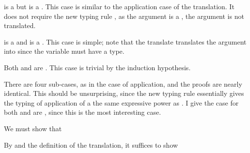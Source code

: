   \item[{\bfseries Sub-case:}] \im{\seone} is a  but \im{\setwo} is a  \im{\sApr}.
    This case is similar to the application case of the  translation.
    It does not require the new typing rule , as the argument
    is a , the argument is not  translated.

  \item[{\bfseries Sub-case:}] \im{\seone} is a  and \im{\setwo} is a
    .
    This case is simple; note that the translate  translates
    the argument \im{\setwo} into \im{\cpsncappe{\setwo^\div}{\sA^+}{\cpsidk}}
    since the  variable must have a  type.

  \item[{\bfseries Sub-case:}] Both \im{\seone} and \im{\setwo} are .
    This case is trivial by the induction hypothesis.

    \item {} \im{\styjudg{\slenv}{\salete{\sx}{\seone}{\sA}{\setwo}}{\subst{\sB}{\seone}{\sx}}}

    There are four sub-cases, as in the case of application, and the proofs are
    nearly identical.
    This should be unsurprising, since the new typing rule 
    essentially gives the typing of application of a  the same
    expressive power as .
    I give the case for both \im{\seone} and \im{\setwo} are , since this
    is the most interesting case.

    \item[{\bfseries Sub-case:}] 

    \noindent We must show that \im{\cpstyjudg{\slenv^+}{
        \cpsfune{\cpsalpha}{\cpsstarty}{
            \begin{stackTL}\cpsfune{\cpsk}{\cpsfunty{\subst{\sB^+}{\cpsncappe{\setwo^\div}{\sA^+}{\cpsidk}}{\cpsx}}{\cpsalpha}}{
              \\\quad\cpscappe{\seone^\div}{\cpsalpha}{(\cpsfune{\cpsx}{\sA^+}{
                  \cpsncappe{\setwo^\div}{\cpsalpha}{\cpsk}})}}}
             \end{stackTL}}{(\subst{\sB}{\setwo}{\sx})^\div}}

    By  and the definition of the translation, it
    suffices to show

    \im{\cpstyjudg{\slenv^+,\cpsalpha:\cpsstarty,
        \cpsk:{\cpsfunty{\subst{\sB^+}{\cpsncappe{\setwo^\div}{\sA^+}{\cpsidk}}{\cpsx}}{
            \cpsalpha}}}{
        \cpscappe{\seone^\div}{\cpsalpha}{(\cpsfune{\cpsx}{\sA^+}{
            \cpsncappe{\setwo^\div}{\cpsalpha}{\cpsk}})}}{\cpsalpha}}

